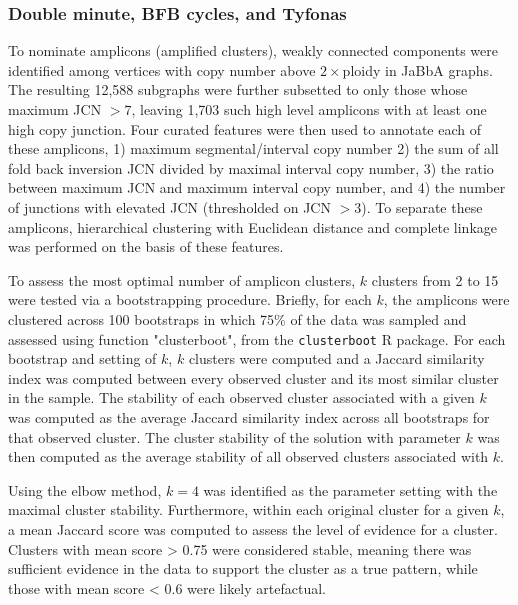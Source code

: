 \documentclass[phd,tocprelim]{cornell}
\begin{document}
\subsubsection*{Double minute, BFB cycles, and Tyfonas}

To nominate amplicons (amplified clusters), weakly connected components were identified among vertices with copy number above $2\times$ploidy in JaBbA graphs. The resulting 12,588 subgraphs were further subsetted to only those whose maximum JCN $>7$, leaving 1,703 such high level amplicons with at least one high copy junction. Four curated features were then used to annotate each of these amplicons, 1) maximum segmental/interval copy number 2) the sum of all fold back inversion JCN divided by maximal interval copy number, 3) the ratio between maximum JCN and maximum interval copy number, and 4) the number of junctions with elevated JCN (thresholded on JCN $> 3$). To separate these amplicons, hierarchical clustering with Euclidean distance and complete linkage was performed on the basis of these features.


To assess the most optimal number of amplicon clusters, $k$ clusters from 2 to 15 were tested via a bootstrapping procedure.   Briefly, for each $k$, the amplicons were clustered across 100 bootstraps in which 75\% of the data was sampled and assessed using function "clusterboot", from the \texttt{clusterboot} R package. For each bootstrap and setting of $k$, $k$ clusters were computed and a Jaccard similarity index was computed between every observed cluster and its most similar cluster in the sample.  The stability of each observed cluster associated with a given $k$ was computed as the average Jaccard similarity index across all bootstraps for that observed cluster.  The cluster stability of the solution with parameter $k$ was then computed as the average stability of all observed clusters associated with $k$.

Using the elbow method, $k=4$ was identified as the parameter setting with the maximal cluster stability.  Furthermore, within each original cluster for a given $k$, a mean Jaccard score was computed to assess the level of evidence for a cluster. Clusters with mean score > 0.75 were considered stable, meaning there was sufficient evidence in the data to support the cluster as a true pattern, while those with mean score < 0.6 were likely artefactual.
\end{document}
